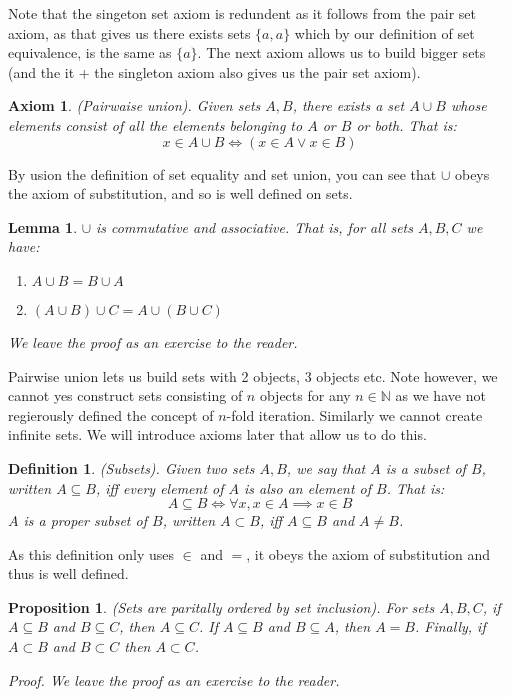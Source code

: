 \documentclass{article}
\newtheorem{definition}{Definition}[subsection]
\newtheorem{axiom}{Axiom}[section]
\newtheorem{proposition}{Proposition}[subsection]
\newtheorem{lemma}{Lemma}[subsection]
\newcommand{\N}{\mathbb{N}}
\begin{document}
Note that the singeton set axiom is redundent as it follows from 
the pair set axiom, as that gives us there exists sets 
$\{a,a\}$ which by our definition of set equivalence, is the same 
as $\{a\}$. The next axiom allows us to build bigger sets (and the 
it + the singleton axiom also gives us the pair set axiom).

\begin{axiom}
	(Pairwaise union). Given sets $A,B$, there exists a set 
	$A \cup B$ whose elements consist of all the elements 
	belonging to $A$ or $B$ or both. That is: 
	$$
	x \in A \cup B \iff (x \in A \lor x \in B)
	$$
\end{axiom}

By usion the definition of set equality and set union, you can 
see that $\cup$ obeys the axiom of substitution, and so is 
well defined on sets.

\begin{lemma}
	$\cup$ is commutative and associative. That is, for all sets	
	$A,B,C$ we have:
	\begin{enumerate}
		\item $A \cup B = B \cup A$
		\item $(A \cup B) \cup C = A \cup (B \cup C)$
	\end{enumerate}
	We leave the proof as an exercise to the reader.
\end{lemma}

Pairwise union lets us build sets with 2 objects, 3 objects etc. 
Note however, we cannot yes construct sets consisting of
$n$ objects for any $n\in\N$ as we have not regierously 
defined the concept of $n$-fold iteration. Similarly we cannot 
create infinite sets. We will introduce axioms later that 
allow us to do this.

\begin{definition}
	(Subsets). Given two sets $A,B$, we say that $A$ is a subset 
	of $B$, written $A \subseteq B$, iff every element of $A$ is 
	also an element of $B$. That is: 
	$$
	A \subseteq B \iff \forall x, x \in A \implies x \in B
	$$
	$A$ is a proper subset of $B$, written $A \subset B$, iff
	$A \subseteq B$ and $A \neq B$.
\end{definition}

As this definition only uses $\in$ and $=$, it obeys the axiom 
of substitution and thus is well defined.

\begin{proposition}
	(Sets are paritally ordered by set inclusion). For sets 
	$A,B,C$, if $A \subseteq B$ and $B \subseteq C$, then
	$A \subseteq C$. If $A \subseteq B$  and $B \subseteq A$, 
	then $A=B$. Finally, if $A \subset B$ and $B \subset C$ 
	then $A \subset C$.

	Proof. We leave the proof as an exercise to the reader.
\end{proposition}
\end{document}
